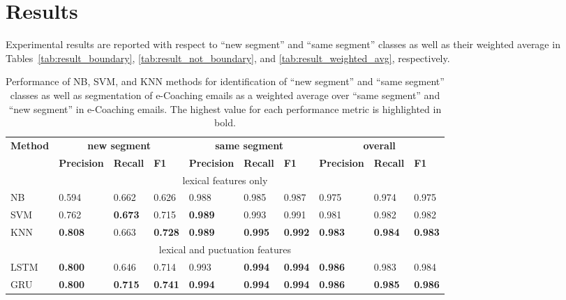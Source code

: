 \documentclass{amia}
\begin{document}
\section*{Results}

Experimental results are reported with respect to ``new segment'' and ``same segment'' classes as well as their weighted average in Tables~\ref{tab:result_boundary}, \ref{tab:result_not_boundary}, and \ref{tab:result_weighted_avg}, respectively.\\

\begin{table}[ht]
\centering
\caption{Performance of NB, SVM, and KNN methods for identification of ``new segment'' and ``same segment'' classes as well as segmentation of e-Coaching emails as a weighted average over ``same segment'' and ``new segment'' in e-Coaching emails. The highest value for each performance metric is highlighted in bold.}
\label{tab:result_base}
  \begin{tabular}{|l|l|l|l|l|l|l|l|l|l|}
  \hline
   \multirow{2}{*}{\textbf{Method}} & \multicolumn{3}{|c|}{\textbf{new segment}} & \multicolumn{3}{|c|}{\textbf{same segment}}  & \multicolumn{3}{|c|}{\textbf{overall}} \\\cline{2-10}
   & \textbf{Precision}  & \textbf{Recall} & \textbf{F1} & \textbf{Precision}  & \textbf{Recall} & \textbf{F1} & \textbf{Precision}  & \textbf{Recall} & \textbf{F1}\\ \hline    
 \multicolumn{10}{|c|}{lexical features only} \\ \hline   
 NB & 0.594 & 0.662 & 0.626 & 0.988 & 0.985 & 0.987 & 0.975 & 0.974 & 0.975  \\ \hline
 SVM & 0.762 & \textbf{0.673} & 0.715 & \textbf{0.989} & 0.993 & 0.991  & 0.981 & 0.982 & 0.982 \\ \hline
 KNN & \textbf{0.808} & 0.663 & \textbf{0.728} & \textbf{0.989} & \textbf{0.995} & \textbf{0.992} & \textbf{0.983} & \textbf{0.984} & \textbf{0.983} \\ \hline
 \multicolumn{10}{|c|}{lexical and puctuation features} \\ \hline
 LSTM & \textbf{0.800} & 0.646 & 0.714  & 0.993 & \textbf{0.994} & \textbf{0.994} & \textbf{0.986} & 0.983 & 0.984 \\ \hline
 GRU & \textbf{0.800} & \textbf{0.715} & \textbf{0.741} & \textbf{0.994} & \textbf{0.994} & \textbf{0.994} & \textbf{0.986} & \textbf{0.985} & \textbf{0.986} \\ \hline
  \end{tabular}
\end{table}                 
\end{document}
